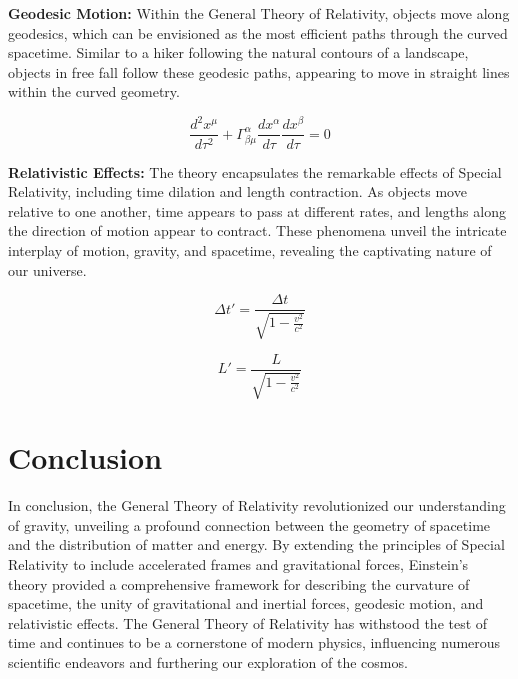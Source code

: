 \documentclass{article}
\begin{document}
\begin{flushleft}
\textbf{Geodesic Motion:} Within the General Theory of Relativity, objects move along geodesics, which can be envisioned as the most efficient paths through the curved spacetime. Similar to a hiker following the natural contours of a landscape, objects in free fall follow these geodesic paths, appearing to move in straight lines within the curved geometry.
\end{flushleft}

\[
\frac{d^2 x^\mu}{d\tau^2} + \Gamma^\alpha_{\beta\mu} \frac{dx^\alpha}{d\tau} \frac{dx^\beta}{d\tau} = 0
\]

\vspace{0.5cm}

\begin{flushleft}
\textbf{Relativistic Effects:} The theory encapsulates the remarkable effects of Special Relativity, including time dilation and length contraction. As objects move relative to one another, time appears to pass at different rates, and lengths along the direction of motion appear to contract. These phenomena unveil the intricate interplay of motion, gravity, and spacetime, revealing the captivating nature of our universe.
\end{flushleft}

\[
\Delta t' = \frac{\Delta t}{\sqrt{1 - \frac{v^2}{c^2}}}
\]

\[
L' = \frac{L}{\sqrt{1 - \frac{v^2}{c^2}}}
\]



\section{Conclusion}

In conclusion, the General Theory of Relativity revolutionized our understanding of gravity, unveiling a profound connection between the geometry of spacetime and the distribution of matter and energy. By extending the principles of Special Relativity to include accelerated frames and gravitational forces, Einstein's theory provided a comprehensive framework for describing the curvature of spacetime, the unity of gravitational and inertial forces, geodesic motion, and relativistic effects. The General Theory of Relativity has withstood the test of time and continues to be a cornerstone of modern physics, influencing numerous scientific endeavors and furthering our exploration of the cosmos.

\vspace{1cm}
\end{document}
